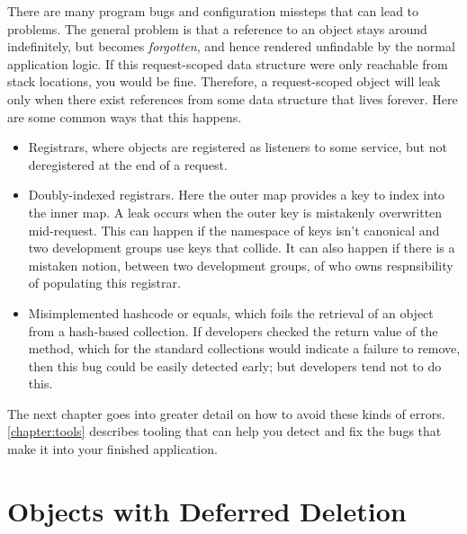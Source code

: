 There are many program bugs and configuration missteps that can lead to
problems. The general problem is that a reference to an object stays around
indefinitely, but becomes
\emph{forgotten}, and hence rendered unfindable by the normal application
logic. If this request-scoped data structure were only reachable from stack
locations, you would be fine. Therefore, a request-scoped object will leak only
when there exist references from some data structure that lives forever. Here
are some common ways that this happens.

\begin{itemize}
  \item Registrars, where objects are registered as listeners to some service,
  but not deregistered at the end of a request.
  \item Doubly-indexed registrars. Here the outer map provides a key to index
  into the inner map. A leak occurs when the outer key is mistakenly
  overwritten mid-request. This can happen if the namespace of keys isn't
  canonical and two development groups use keys that collide. It can also
  happen if there is a mistaken notion, between two development groups, of who
  owns respnsibility of populating this registrar.
  \item Misimplemented hashcode or equals, which foils the retrieval of an
  object from a hash-based collection. If developers checked the return value of
  the  method, which for the standard collections would indicate a failure to remove, then
  this bug could be easily detected early; but developers tend not to do this.
\end{itemize}

The next chapter goes into greater detail on how to avoid these kinds of
errors. \autoref{chapter:tools} describes tooling that can help you
detect and fix the bugs that make it into your finished application.



\section{Objects with Deferred Deletion}
\label{deferred-deletion}

